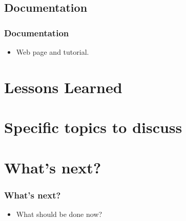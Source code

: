 \documentclass{beamer}
\begin{document}
\subsection{Documentation}

\begin{frame}
  \frametitle{Documentation}
  \begin{itemize}
  \item Web page and tutorial.
  \end{itemize}
  
\end{frame}

\section{Lessons Learned}

\section{Specific topics to discuss}

\section{What's next?}

\begin{frame}
  \frametitle{What's next?}
 \begin{itemize}
 \item What should be done now?
 \end{itemize}
\end{frame}
\end{document}
